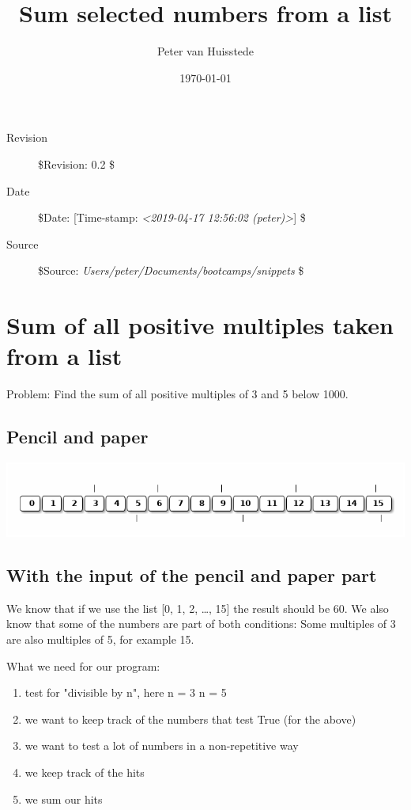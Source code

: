 \documentclass[11pt]{article}
\author{Peter van Huisstede}
\date{\today}
\title{Sum selected numbers from a list}
\begin{document}
\maketitle
\begin{description}
\item[{Revision}] \$Revision: 0.2 \$
\item[{Date}] \$Date: [Time-stamp: \textit{<2019-04-17 12:56:02 (peter)>}] \$
\item[{Source}] \$Source: \emph{Users/peter/Documents/bootcamps/snippets} \$
\end{description}


\section*{Sum of all positive multiples taken from a list}
\label{sec-1}

Problem: Find the sum of all positive multiples of 3 and 5 below 1000.

\subsection*{Pencil and paper}
\label{sec-1-1}

\includegraphics[width=.9\linewidth]{img/pep_sum_pos_multiples.png}

\subsection*{With the input of the pencil and paper part}
\label{sec-1-2}

We know that if we use the list [0, 1, 2, \ldots{}, 15] the result should
be 60. We also know that some of the numbers are part of both
conditions: Some multiples of 3 are also multiples of 5, for
example 15.

What we need for our program:

\begin{enumerate}
\item test for "divisible by n", here n = 3  n = 5
\item we want to keep track of the numbers that test True (for the above)
\item we want to test a lot of numbers in a non-repetitive way
\item we keep track of the hits
\item we sum our hits
\end{enumerate}
\end{document}
